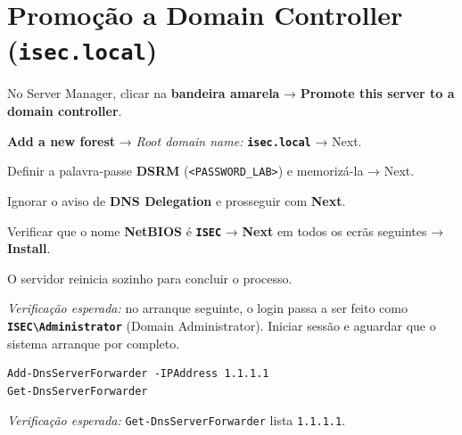 
\section[Promoção a Domain Controller (isec.local)]{Promoção a Domain Controller (\texttt{isec.local})}


No Server Manager, clicar na \textbf{bandeira amarela} → \textbf{Promote this server to a domain controller}.


\textbf{Add a new forest} → \emph{Root domain name:} \textbf{\texttt{isec.local}} → Next.


Definir a palavra-passe \textbf{DSRM} (\texttt{\textless{}PASSWORD\_LAB\textgreater{}}) e memorizá-la → Next.


Ignorar o aviso de \textbf{DNS Delegation} e prosseguir com \textbf{Next}.


Verificar que o nome \textbf{NetBIOS} é \textbf{\texttt{ISEC}} → \textbf{Next} em todos os ecrãs seguintes → \textbf{Install}.


O servidor reinicia sozinho para concluir o processo.

\emph{Verificação esperada:} no arranque seguinte, o login passa a ser feito como \textbf{\texttt{ISEC\textbackslash{}Administrator}} (Domain Administrator). Iniciar sessão e aguardar que o sistema arranque por completo.


\begin{lstlisting}[style=psstyle]
Add-DnsServerForwarder -IPAddress 1.1.1.1
Get-DnsServerForwarder
\end{lstlisting}

\emph{Verificação esperada:} \texttt{Get-DnsServerForwarder} lista \texttt{1.1.1.1}.

